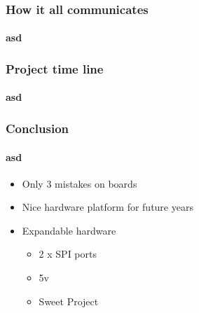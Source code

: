 \documentclass{beamer}
\begin{document}
\begin{frame}
\frametitle{How it all communicates}
\framesubtitle{asd}
\end{frame}

\begin{frame}
\frametitle{Project time line}
\framesubtitle{asd}
\end{frame}

\begin{frame}
\frametitle{Conclusion}
\framesubtitle{asd}
\begin{itemize}
\item Only 3 mistakes on boards
\item Nice hardware platform for future years
\item Expandable hardware
\begin{itemize}
\item 2 x SPI ports
\item 5v
\item Sweet Project
\end{itemize}
\end{itemize}
\end{frame}
\end{document}
